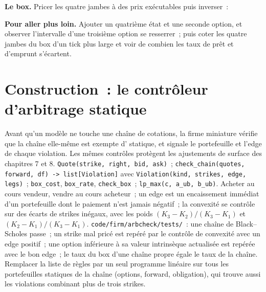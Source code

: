 \begin{tutorial}
\begin{tutsteps}
\item \textbf{Le box.} Pricer les quatre jambes à des prix exécutables puis inverser~:
\label{lst:dv:no-arbitrage-and-the-fundamental-theorems:box}
\end{tutsteps}
\textbf{Pour aller plus loin.} Ajouter un quatrième état et une seconde option, et observer
l'intervalle d'une troisième option se resserrer~; puis coter les quatre jambes du box
d'un tick plus large et voir de combien les taux de prêt et d'emprunt s'écartent.
\end{tutorial}

\section{Construction~: le contrôleur d'arbitrage statique}\label{bld:dv:no-arbitrage-and-the-fundamental-theorems:arbcheck}

\begin{build}
 Avant qu'un modèle ne touche une chaîne de cotations, la firme miniature
vérifie que la chaîne elle-même est exempte d' statique, et signale le
portefeuille et l'edge de chaque violation. Les mêmes contrôles protègent les ajustements
de surface des chapitres 7 et 8.
 \texttt{Quote(strike, right, bid, ask)}~;
\texttt{check\_chain(quotes, forward, df) -> list[Violation]} avec
\texttt{Violation(kind, strikes, edge, legs)}~; \texttt{box\_cost},
\texttt{box\_rate}, \texttt{check\_box}~; \texttt{lp\_max(c, a\_ub, b\_ub)}.
 Acheter au cours vendeur, vendre au cours acheteur~; un edge est un encaissement immédiat
d'un portefeuille dont le paiement n'est jamais négatif~; la convexité se contrôle sur des
écarts de strikes inégaux, avec les poids $(K_3-K_2)/(K_3-K_1)$ et $(K_2-K_1)/(K_3-K_1)$.
 \texttt{code/firm/arbcheck/tests/}~: une chaîne de
Black--Scholes passe~; un strike mal pricé est repéré par le contrôle de convexité avec un
edge positif~; une option inférieure à sa valeur intrinsèque actualisée est repérée avec le
bon edge~; le taux du box d'une chaîne propre égale le taux de la chaîne.
 Remplacer la liste de règles par un seul programme linéaire
sur tous les portefeuilles statiques de la chaîne (options, forward, obligation), qui trouve
aussi les violations combinant plus de trois strikes.
\end{build}

